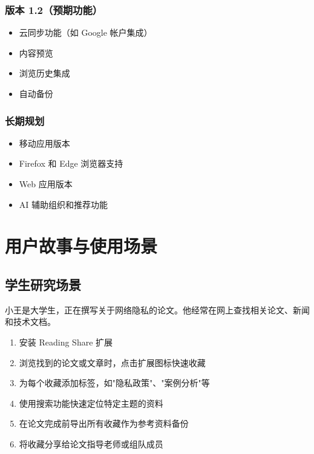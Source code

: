\documentclass[10pt,a4paper]{article}
\newcommand{\subtitle}[1]{%
  \vspace{3pt}
  \noindent{\textbf{#1}}
}
\begin{document}
\begin{itemize}
\begin{itemize}
\begin{itemize}
\begin{itemize}
\begin{enumerate}
\begin{itemize}
\subsubsection{版本 1.2（预期功能）}
\begin{itemize}
  \item 云同步功能（如 Google 帐户集成）
  \item 内容预览
  \item 浏览历史集成
  \item 自动备份
\end{itemize}

\subsubsection{长期规划}
\begin{itemize}
  \item 移动应用版本
  \item Firefox 和 Edge 浏览器支持
  \item Web 应用版本
  \item AI 辅助组织和推荐功能
\end{itemize}

\vspace{5pt}

\section{用户故事与使用场景}

\subsection{学生研究场景}

\subtitle{场景描述}
小王是大学生，正在撰写关于网络隐私的论文。他经常在网上查找相关论文、新闻和技术文档。

\subtitle{使用步骤}
\begin{enumerate}
  \item 安装 Reading Share 扩展
  \item 浏览找到的论文或文章时，点击扩展图标快速收藏
  \item 为每个收藏添加标签，如"隐私政策"、"案例分析"等
  \item 使用搜索功能快速定位特定主题的资料
  \item 在论文完成前导出所有收藏作为参考资料备份
  \item 将收藏分享给论文指导老师或组队成员
\end{enumerate}


\end{itemize}
\end{enumerate}
\end{itemize}
\end{itemize}
\end{itemize}
\end{itemize}
\end{document}
